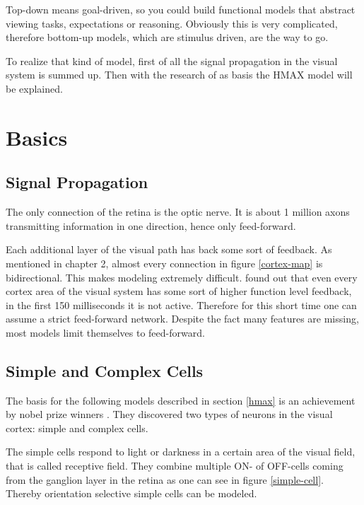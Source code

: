 	Top-down means goal-driven, so you could build functional models that abstract viewing tasks, expectations or reasoning. Obviously this is very complicated, therefore bottom-up models, which are stimulus driven, are the way to go.
	
	To realize that kind of model, first of all the signal propagation in the visual system is summed up. Then with the research of \citep{hubel1962receptive} as basis the HMAX model will be explained.

	\section{Basics}
			
		\subsection{Signal Propagation}\label{signal}
			
			The only connection of the retina is the optic nerve. It is about 1 million axons transmitting information in one direction, hence only feed-forward.
			
			Each additional layer of the visual path has back some sort of feedback. As mentioned in chapter 2, almost every connection in figure \ref{cortex-map} is bidirectional. This makes modeling extremely difficult. \citeauthor{thorpe1996speed} found out that even every cortex area of the visual system has some sort of higher function level feedback, in the first 150 milliseconds it is not active. Therefore for this short time one can assume a strict feed-forward network. Despite the fact many features are missing, most models limit themselves to feed-forward.
			
		\subsection{Simple and Complex Cells}
			
			The basis for the following models described in section \ref{hmax} is an achievement by nobel prize winners \citeauthor{hubel1962receptive}. They discovered two types of neurons in the visual cortex: simple and complex cells.
			
			The simple cells respond to light or darkness in a certain area of the visual field, that is called receptive field. They combine multiple ON- of OFF-cells coming from the ganglion layer in the retina as one can see in figure \ref{simple-cell}. Thereby orientation selective simple cells can be modeled.
	
